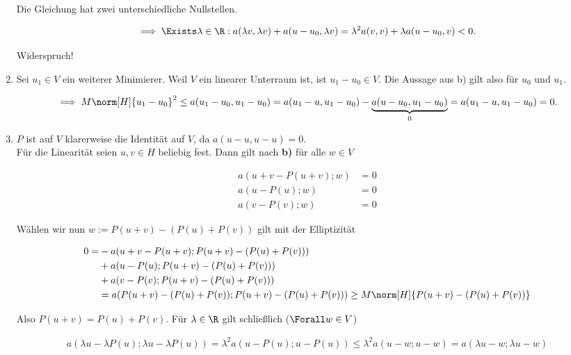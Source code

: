 \begin{solution}
\begin{enumerate}[label = \textbf{\alph*)}]
  Die Gleichung hat zwei unterschiedliche Nullstellen.

  \begin{align*}
    \implies
    \Exists \lambda \in \R:
    a(\lambda v, \lambda v) + a(u - u_0, \lambda v)
    =
    \lambda^2 a(v,v) + \lambda a(u - u_0, v) < 0.
  \end{align*}

  Widerspruch!

  \item Sei $u_1 \in V$ ein weiterer Minimierer.
  Weil $V$ ein linearer Unterraum ist, ist $u_1 - u_0 \in V$.
  Die Aussage aus b) gilt also für $u_0$ und $u_1$.

  \begin{align*}
    \implies
    M \norm[H]{u_1 - u_0}^2
    \leq
    a(u_1 - u_0, u_1 - u_0)
    =
    a(u_1 - u, u_1 - u_0)
    -
    \underbrace{a(u - u_0, u_1 - u_0)}_0
    =
    a(u_1 - u, u_1 - u_0) = 0.
  \end{align*}

  \item $P$ ist auf $V$ klarerweise die Identität auf $V$, da $a(u - u, u - u) = 0$. \\
  Für die Linearität seien $u, v \in H$ beliebig fest. Dann gilt nach \textbf{b)} für alle $w \in V$

    \begin{align*}
      a(u + v - P(u+v); w) &= 0 \\
      a(u - P(u); w) &= 0 \\
      a(v - P(v); w) &= 0
    \end{align*}

  Wählen wir nun $w := P(u + v) - (P(u) + P(v))$ gilt mit der Elliptizität

  \begin{align*}
    0
    =
    &- a(u + v - P(u + v);P(u + v) - (P(u) + P(v))) \\
    &+ a(u - P(u);P(u + v) - (P(u) + P(v))) \\
    &+ a(v - P(v);P(u + v) - (P(u) + P(v))) \\
    &=
    a(P(u + v) - (P(u) + P(v));P(u + v) - (P(u) + P(v)))
    \geq
    M \norm[H]{P(u + v) - (P(u) + P(v))}
  \end{align*}

  Also $P(u + v) = P(u) + P(v)$. Für $\lambda \in \R$ gilt schließlich ($\Forall w \in V$)

  \begin{align*}
    a(\lambda u - \lambda P(u);\lambda u - \lambda P(u))
    =
    \lambda^2 a(u - P(u);u - P(u))
    \leq
    \lambda^2 a(u - w; u - w)
    =
    a(\lambda u - w; \lambda u - w)
  \end{align*}


\end{enumerate}
\end{solution}
